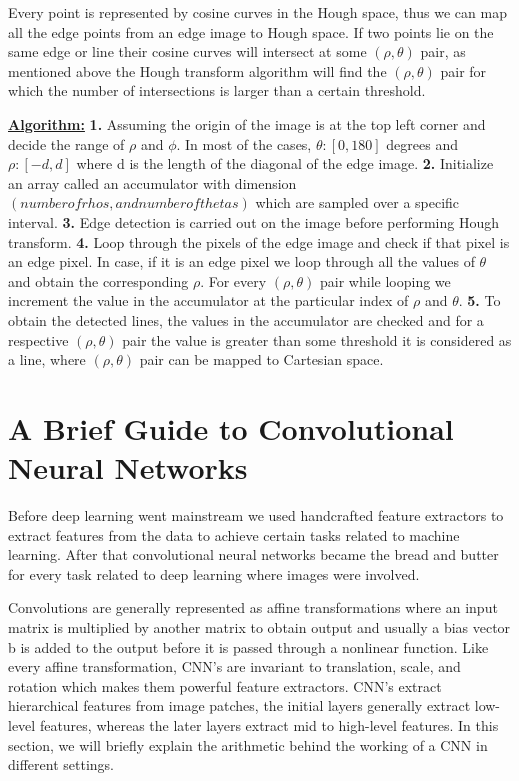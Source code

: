      Every point is represented by cosine curves in the Hough space, thus we can map all the edge points from an edge image to Hough space. If two points lie on the same edge or line their cosine curves will intersect at some $(\rho,\theta)$ pair, as mentioned above the Hough transform algorithm will find the $(\rho,\theta)$ pair for which the number of intersections is larger than a certain threshold. \newline 
    
    
    \underline{\textbf{Algorithm:}} \newline
    \textbf{1.} Assuming the origin of the image is at the top left corner and decide the range of $\rho$ and $\phi$. In most of the cases, $\theta:[0, 180]$ degrees and $\rho:[-d,d]$ where d is the length of the diagonal of the edge image. \newline
    \textbf{2.} Initialize an array called an accumulator with dimension $(number of rhos, and number of thetas)$ which are sampled over a specific interval. \newline
    \textbf{3.} Edge detection is carried out on the image before performing Hough transform.\newline 
    \textbf{4.} Loop through the pixels of the edge image and check if that pixel is an edge pixel. In case, if it is an edge pixel we loop through all the values of $\theta$ and obtain the corresponding $\rho$. For every $(\rho, \theta)$ pair while looping we increment the value in the accumulator at the particular index of $\rho$ and $\theta$. \newline
    \textbf{5.} To obtain the detected lines, the values in the accumulator are checked and for a respective $(\rho,\theta)$ pair the value is greater than some threshold it is considered as a line, where $(\rho,\theta)$ pair can be mapped to Cartesian space.  
    
    \section{A Brief Guide to Convolutional Neural Networks}
    Before deep learning went mainstream we used handcrafted feature extractors to extract features from the data to achieve certain tasks related to machine learning.
    After that convolutional neural networks became the bread and butter for every task related to deep learning where images were involved. 
    
    Convolutions are generally represented as affine transformations where an input matrix is multiplied by another matrix to obtain output and usually a bias vector b is added to the output before it is passed through a nonlinear function. Like every affine transformation, CNN's are invariant to translation, scale, and rotation which makes them powerful feature extractors. CNN's extract hierarchical features from image patches, the initial layers generally extract low-level features, whereas the later layers extract mid to high-level features. In this section, we will briefly explain the arithmetic behind the working of a CNN in different settings. 
    
